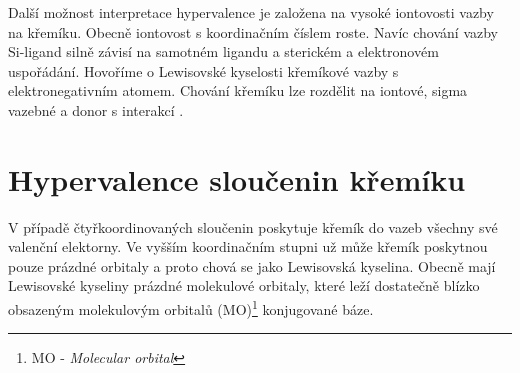 \documentclass[
digital, %
table,   %
lof,     %
lot,     %
oneside,
]{fithesis3}
\begin{document}
Další možnost interpretace hypervalence je založena na vysoké iontovosti vazby na křemíku. Obecně iontovost s koordinačním číslem roste.
Navíc chování vazby Si-ligand silně závisí na samotném ligandu a sterickém a elektronovém uspořádání. Hovoříme o Lewisovské kyselosti křemíkové vazby s elektronegativním atomem. Chování křemíku lze rozdělit na iontové, sigma vazebné a donor s interakcí \cite{Wagler2014}.\\


\section{Hypervalence sloučenin křemíku}\label{teorie_hypervalence}
V případě čtyřkoordinovaných sloučenin poskytuje křemík do vazeb všechny své valenční elektorny. Ve vyšším koordinačním stupni už může křemík poskytnou pouze prázdné orbitaly a proto chová se jako Lewisovská kyselina. Obecně mají Lewisovské kyseliny prázdné molekulové orbitaly, které leží dostatečně blízko obsazeným molekulovým orbitalů (MO)\footnote{MO - \textit{Molecular orbital}} konjugované báze.
\end{document}

